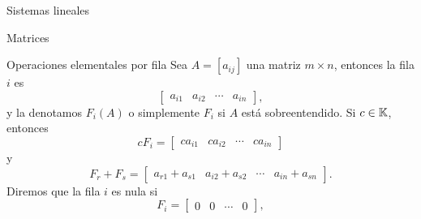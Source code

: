 \begin{chapter}{Sistemas lineales}
\begin{section}{Matrices}
            \begin{subsection}{Operaciones elementales por fila}
                Sea $A = [a_{ij}]$ una matriz $m \times  n$,  entonces la fila $i$ es 
                $$
                \begin{bmatrix} a_{i1}& a_{i2}& \cdots &a_{in} 	\end{bmatrix},
                $$
                y la denotamos $F_i(A)$ o simplemente $F_i$ si $A$ está sobreentendido. Si $c\in \mathbb K$,  entonces 
                $$
                cF_i = \begin{bmatrix} ca_{i1}& ca_{i2}& \cdots &ca_{in} 	\end{bmatrix}
                $$
                y
                $$
                F_r + F_s = \begin{bmatrix} a_{r1}+a_{s1}& a_{i2}+a_{s2}& \cdots &a_{in}+a_{sn} 	\end{bmatrix}.
                $$ 
                Diremos que la fila $i$ es nula si 
                $$
                F_i = \begin{bmatrix} 0& 0& \cdots &0 	\end{bmatrix},
                $$
                

\end{subsection}
\end{section}
\end{chapter}
